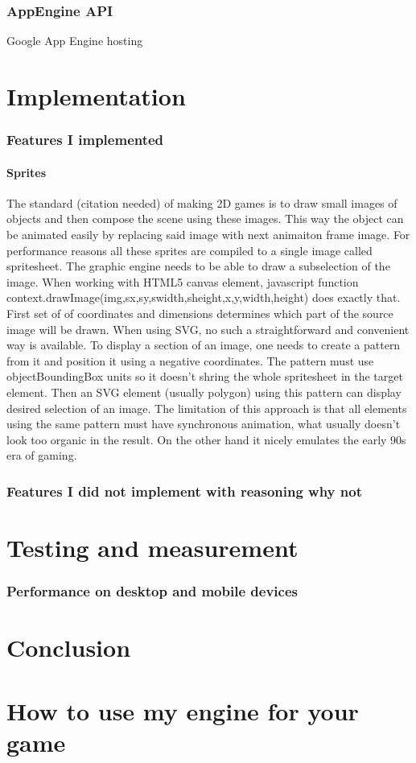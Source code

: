 \documentclass[11pt,oneside, final]{fithesis2}
\begin{document}
\subsection{AppEngine API}
Google App Engine hosting

\chapter{Implementation}
\subsection{Features I implemented}
\subsubsection{Sprites}
The standard (citation needed) of making 2D games is to draw small images of objects and then compose the scene using these images. This way the object can be animated easily by replacing said image with next animaiton frame image. For performance reasons all these sprites are compiled to a single image called spritesheet. The graphic engine needs to be able to draw a subselection of the image. When working with HTML5 canvas element, javascript function context.drawImage(img,sx,sy,swidth,sheight,x,y,width,height) does exactly that. First set of of coordinates and dimensions determines which part of the source image will be drawn. When using SVG, no such a straightforward and convenient way is available. To display a section of an image, one needs to create a pattern from it and position it using a negative coordinates. The pattern must use objectBoundingBox units so it doesn't shring the whole spritesheet in the target element. Then an SVG element (usually polygon) using this pattern can display desired selection of an image.
The limitation of this approach is that all elements using the same pattern must have synchronous animation, what usually doesn't look too organic in the result. On the other hand it nicely emulates the early 90s era of gaming.

\subsection{Features I did not implement with reasoning why not}

\chapter{Testing and measurement}
\subsection{Performance on desktop and mobile devices}

\chapter{Conclusion}


\appendix
\chapter{How to use my engine for your game}
\end{document}
